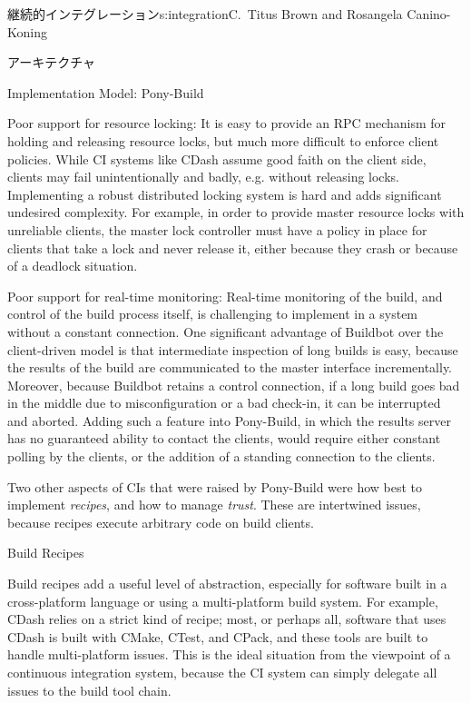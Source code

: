 \begin{aosachapter}{継続的インテグレーション}{s:integration}{C.\ Titus Brown and Rosangela Canino-Koning}
\begin{aosasect1}{アーキテクチャ}
\begin{aosasect2}{Implementation Model: Pony-Build}
\begin{aosadescription}
  \item{Poor support for resource locking:} It is easy to
  provide an RPC mechanism for holding and releasing resource locks,
  but much more difficult to enforce client policies. While CI
  systems like CDash assume good faith on the client side, clients
  may fail unintentionally and badly, e.g. without releasing
  locks. Implementing a robust distributed locking system is hard
  and adds significant undesired complexity. For example, in order
  to provide master resource locks with unreliable clients, the
  master lock controller must have a policy in place for clients
  that take a lock and never release it, either because they crash
  or because of a deadlock situation.

  \item{Poor support for real-time monitoring:} Real-time
  monitoring of the build, and control of the build process
  itself, is challenging to implement in a system without a constant
  connection. One significant advantage of Buildbot over the
  client-driven model is that intermediate inspection of long builds
  is easy, because the results of the build are communicated to the
  master interface incrementally. Moreover, because Buildbot retains
  a control connection, if a long build goes bad in the middle
  due to misconfiguration or a bad check-in, it can be interrupted
  and aborted. Adding such a feature into Pony-Build, in which the
  results server has no guaranteed ability to contact the clients,
  would require either constant polling by the clients, or the
  addition of a standing connection to the clients.

\end{aosadescription}

Two other aspects of CIs that were raised by Pony-Build were how best
to implement \emph{recipes}, and how to manage \emph{trust}. These are
intertwined issues, because recipes execute arbitrary code on build
clients.

\end{aosasect2}

\begin{aosasect2}{Build Recipes}

Build recipes add a useful level of abstraction, especially for
software built in a cross-platform language or using a multi-platform
build system. For example, CDash relies on a strict kind of
recipe; most, or perhaps all, software that uses CDash is built
with CMake, CTest, and CPack, and these tools are built to handle
multi-platform issues. This is the ideal situation from the viewpoint
of a continuous integration system, because the CI system can simply
delegate all issues to the build tool chain.


\end{aosasect2}
\end{aosasect1}
\end{aosachapter}
